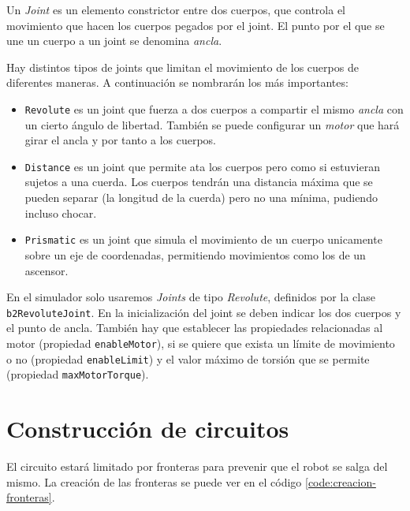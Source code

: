 Un \emph{Joint} es un elemento constrictor entre dos cuerpos, que controla el movimiento que hacen los cuerpos pegados por el joint. El punto por el que se une un cuerpo a un joint se denomina \emph{ancla}.

Hay distintos tipos de joints que limitan el movimiento de los cuerpos de diferentes maneras. A continuación se nombrarán los más importantes:

\begin{itemize}
	\item \texttt{Revolute} es un joint que fuerza a dos cuerpos a compartir el mismo \emph{ancla} con un cierto ángulo de libertad. También se puede configurar un \emph{motor} que hará girar el ancla y por tanto a los cuerpos.
	\item \texttt{Distance} es un joint que permite ata los cuerpos pero como si estuvieran sujetos a una cuerda. Los cuerpos tendrán una distancia máxima que se pueden separar (la longitud de la cuerda) pero no una mínima, pudiendo incluso chocar.
	\item \texttt{Prismatic} es un joint que simula el movimiento de un cuerpo unicamente sobre un eje de coordenadas, permitiendo movimientos como los de un ascensor.
\end{itemize}

En el simulador solo usaremos \emph{Joints} de tipo \emph{Revolute}, definidos por la clase \texttt{b2RevoluteJoint}.  En la inicialización del joint se deben indicar los dos cuerpos y el punto de ancla. También hay que establecer las propiedades relacionadas al motor (propiedad \texttt{enableMotor}), si se quiere que exista un límite de movimiento o no (propiedad \texttt{enableLimit}) y el valor máximo de torsión que se permite (propiedad \texttt{maxMotorTorque}).






\chapter{Construcción de circuitos}
\label{sec:construccion-circuitos}

El circuito estará limitado por fronteras para prevenir que el robot se salga del mismo. La creación de las fronteras se puede ver en el código \ref{code:creacion-fronteras}.

